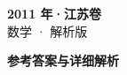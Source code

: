 \documentclass[zihao=-4, a4paper]{ctexart}
\begin{document}
\begin{center}
  {\Large\bfseries 2011 年·江苏卷}\\[4pt]
  {\large 数学 · 解析版}
\end{center}
\medskip
{}

\clearpage
{}
\begin{center}{\Large\bfseries 参考答案与详细解析}\end{center}
\medskip

\end{document}
